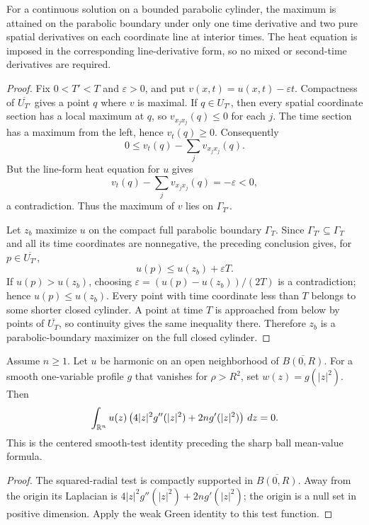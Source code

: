 \begin{lemma}
\label{lem:weak-maximum-principle-heat-anisotropic}


For a continuous solution on a bounded parabolic cylinder, the maximum is
attained on the parabolic boundary under only one time derivative and two pure
spatial derivatives on each coordinate line at interior times. The heat equation
is imposed in the corresponding line-derivative form, so no mixed or second-time
derivatives are required.
\end{lemma}
\begin{proof}

Fix $0<T'<T$ and $\varepsilon>0$, and put $v(x,t)=u(x,t)-\varepsilon t$.
Compactness of $\overline{U_{T'}}$ gives a point $q$ where $v$ is maximal. If
$q\in U_{T'}$, then every spatial coordinate section has a local maximum at
$q$, so $v_{x_jx_j}(q)\leq0$ for each $j$. The time section has a maximum from
the left, hence $v_t(q)\geq0$. Consequently
\[
 0\leq v_t(q)-\sum_jv_{x_jx_j}(q).
\]
But the line-form heat equation for $u$ gives
\[
 v_t(q)-\sum_jv_{x_jx_j}(q)=-\varepsilon<0,
\]
a contradiction. Thus the maximum of $v$ lies on $\Gamma_{T'}$.

Let $z_b$ maximize $u$ on the compact full parabolic boundary $\Gamma_T$.
Since $\Gamma_{T'}\subseteq\Gamma_T$ and all its time coordinates are
nonnegative, the preceding conclusion gives, for
$p\in\overline{U_{T'}}$,
\[
 u(p)\leq u(z_b)+\varepsilon T.
\]
If $u(p)>u(z_b)$, choosing
$\varepsilon=(u(p)-u(z_b))/(2T)$ is a contradiction; hence
$u(p)\leq u(z_b)$. Every point with time coordinate less than $T$ belongs to
some shorter closed cylinder. A point at time $T$ is approached from below by
points of $\overline{U_T}$, so continuity gives the same inequality there.
Therefore $z_b$ is a parabolic-boundary maximizer on the full closed cylinder.
\end{proof}

\begin{lemma}
\label{lem:weak-radial-ode-identity}


Assume $n\geq 1$. Let $u$ be harmonic on an open neighborhood of
$\overline{B(0,R)}$. For a
smooth one-variable profile $g$ that vanishes for $\rho>R^2$, set
$w(z)=g(|z|^2)$. Then
\[
\int_{\mathbb{R}^n}u(z)\left(4|z|^2g''(|z|^2)+2n g'(|z|^2)\right)\,dz=0.
\]
This is the centered smooth-test identity preceding the sharp ball mean-value
formula.
\end{lemma}
\begin{proof}

The squared-radial test is compactly supported in $\overline{B(0,R)}$.
Away from the origin its Laplacian is
$4|z|^2g''(|z|^2)+2n g'(|z|^2)$; the origin is a null set in positive
dimension. Apply the weak Green identity to this test function.
\end{proof}

